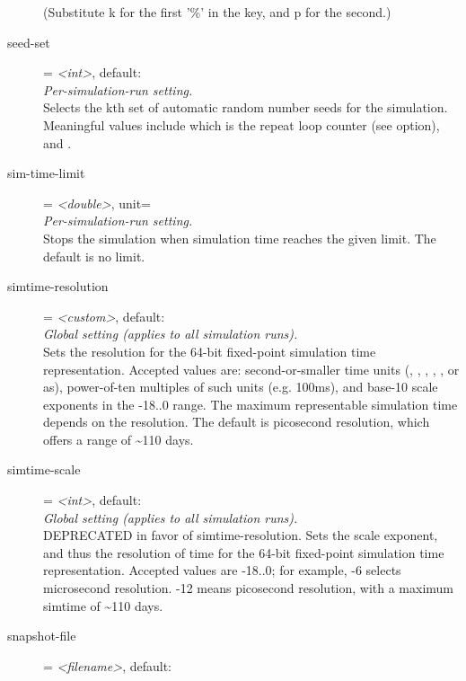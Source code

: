 \begin{description}
    (Substitute k for the first '\%' in the key, and p for the second.)
\item[seed-set] = \textit{<int>}, default: \\
    \textit{Per-simulation-run setting.}\\
    Selects the kth set of automatic random number seeds for the simulation.
    Meaningful values include 
    which is the repeat loop counter (see  option), and
    .
\item[sim-time-limit] = \textit{<double>}, unit=\\
    \textit{Per-simulation-run setting.}\\
    Stops the simulation when simulation time reaches the given limit. The
    default is no limit.
\item[simtime-resolution] = \textit{<custom>}, default: \\
    \textit{Global setting (applies to all simulation runs).}\\
    Sets the resolution for the 64-bit fixed-point simulation time
    representation. Accepted values are: second-or-smaller time units (,
    , , , ,  or as), power-of-ten
    multiples of such units (e.g. 100ms), and base-10 scale exponents in the
    -18..0 range. The maximum representable simulation time depends on the
    resolution. The default is picosecond resolution, which offers a range of
    {\textasciitilde}110 days.
\item[simtime-scale] = \textit{<int>}, default: \\
    \textit{Global setting (applies to all simulation runs).}\\
    DEPRECATED in favor of simtime-resolution. Sets the scale exponent, and
    thus the resolution of time for the 64-bit fixed-point simulation time
    representation. Accepted values are -18..0; for example, -6 selects
    microsecond resolution. -12 means picosecond resolution, with a maximum
    simtime of {\textasciitilde}110 days.
\item[snapshot-file] = \textit{<filename>}, default: \\

\end{description}
